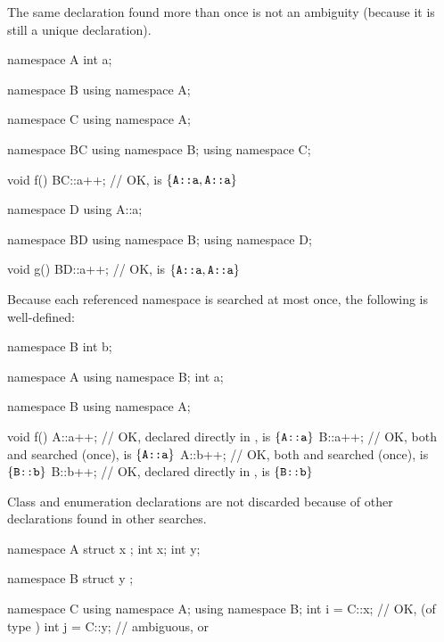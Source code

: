 \pnum
\begin{note}
The same declaration found more than once is not an ambiguity (because
it is still a unique declaration).
\begin{example}
\begin{codeblock}
namespace A {
  int a;
}

namespace B {
  using namespace A;
}

namespace C {
  using namespace A;
}

namespace BC {
  using namespace B;
  using namespace C;
}

void f()
{
  BC::a++;          // OK,  is $\{ \tcode{A::a}, \tcode{A::a} \}$
}

namespace D {
  using A::a;
}

namespace BD {
  using namespace B;
  using namespace D;
}

void g()
{
  BD::a++;          // OK,  is $\{ \tcode{A::a}, \tcode{A::a} \}$
}
\end{codeblock}
\end{example}
\end{note}

\pnum
\begin{example}
Because each referenced namespace is searched at most once, the
following is well-defined:
\begin{codeblock}
namespace B {
  int b;
}

namespace A {
  using namespace B;
  int a;
}

namespace B {
  using namespace A;
}

void f()
{
  A::a++;           // OK,  declared directly in ,  is $\{ \tcode{A::a} \}$
  B::a++;           // OK, both  and  searched (once),  is $\{ \tcode{A::a} \}$
  A::b++;           // OK, both  and  searched (once),  is $\{ \tcode{B::b} \}$
  B::b++;           // OK,  declared directly in ,  is $\{ \tcode{B::b} \}$
}
\end{codeblock}
\end{example}

\pnum
\begin{note}
Class and enumeration declarations are not discarded
because of other declarations found in other searches.
\end{note}
\begin{example}
\begin{codeblock}
namespace A {
  struct x { };
  int x;
  int y;
}

namespace B {
  struct y { };
}

namespace C {
  using namespace A;
  using namespace B;
  int i = C::x;     // OK,  (of type )
  int j = C::y;     // ambiguous,  or 
}
\end{codeblock}
\end{example}

